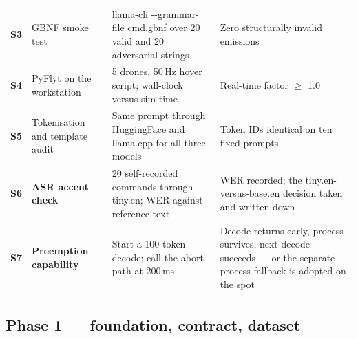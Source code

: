 \documentclass[11pt,a4paper]{article}
\newcommand{\code}[1]{{\ttfamily\small #1}}
\newcommand{\munit}[1]{\,#1}
\begin{document}
\begin{longtable}{@{}P{0.06}P{0.28}P{0.28}P{0.26}@{}}
\textbf{S3} & GBNF smoke test & \code{llama-cli -{}-grammar-file cmd.gbnf} over 20 valid and 20
  adversarial strings & Zero structurally invalid emissions \\
\textbf{S4} & PyFlyt on the workstation & 5 drones, 50\munit{Hz} hover script; wall-clock versus sim time
  & Real-time factor $\geq$ 1.0 \\
\textbf{S5} & Tokenisation and template audit & Same prompt through HuggingFace and \code{llama.cpp} for
  all three models & Token IDs identical on ten fixed prompts \\
\textbf{S6} & \textbf{ASR accent check} & 20 self-recorded commands through \code{tiny.en}; WER against
  reference text & WER recorded; the \code{tiny.en}-versus-\code{base.en} decision taken and written down \\
\textbf{S7} & \textbf{Preemption capability} & Start a 100-token decode; call the abort path at
  200\munit{ms} & Decode returns early, process survives, next decode succeeds --- or the separate-process
  fallback is adopted on the spot \\
\end{longtable}

\subsection{Phase 1 --- foundation, contract, dataset}
\end{document}
